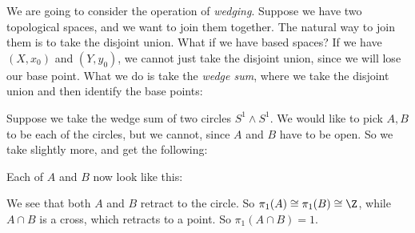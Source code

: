 \documentclass[a4paper]{article}
\begin{document}
\begin{eg}
  We are going to consider the operation of \emph{wedging}. Suppose we have two topological spaces, and we want to join them together. The natural way to join them is to take the disjoint union. What if we have based spaces? If we have $(X, x_0)$ and $(Y, y_0)$, we cannot just take the disjoint union, since we will lose our base point. What we do is take the \emph{wedge sum}, where we take the disjoint union and then identify the base points:
  \begin{center}
  \end{center}
  Suppose we take the wedge sum of two circles $S^1 \wedge S^1$. We would like to pick $A, B$ to be each of the circles, but we cannot, since $A$ and $B$ have to be open. So we take slightly more, and get the following:
  \begin{center}
  \end{center}
  Each of $A$ and $B$ now look like this:
  \begin{center}
  \end{center}
  We see that both $A$ and $B$ retract to the circle. So $\pi_1(A) \cong \pi_1(B) \cong \Z$, while $A\cap B$ is a cross, which retracts to a point. So $\pi_1 (A\cap B) = 1$.


\end{eg}
\end{document}
